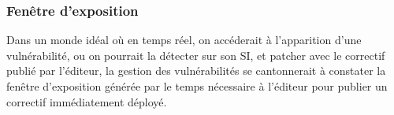 %	
%
%


\subsubsection{Fenêtre d'exposition}


Dans un monde idéal où en  temps réel, on accéderait à l'apparition d'une vulnérabilité, ou on pourrait la détecter sur son SI, et patcher avec le correctif publié par l'éditeur, la gestion des vulnérabilités se cantonnerait à constater la fenêtre d’exposition générée par le temps nécessaire à l’éditeur pour publier un correctif immédiatement déployé.

